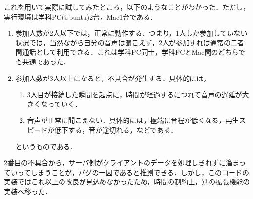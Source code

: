 \documentclass[10.5pt,a4paper,dvipdfmx]{jsarticle}
\begin{document}
これを用いて実際に試してみたところ，以下のようなことがわかった．ただし，実行環境は学科PC(Ubuntu)2台，Mac1台である．
\begin{enumerate}
    \item 参加人数が2人以下では，正常に動作する．つまり，1人しか参加していない状況では，当然ながら自分の音声は聞こえず，2人が参加すれば通常の二者間通話として利用できる．これは学科PC同士，学科PCとMac間のどちらでも共通であった．
    \item 参加人数が3人以上になると，不具合が発生する．具体的には，
        \begin{enumerate}
            \item 3人目が接続した瞬間を起点に，時間が経過するにつれて音声の遅延が大きくなっていく．
            \item 音声が正常に聞こえない．具体的には，極端に音程が低くなる，再生スピードが低下する，音が途切れる，などである．
        \end{enumerate}
        というものである．
\end{enumerate}
2番目の不具合から，サーバ側がクライアントのデータを処理しきれずに溜まっていってしまうことが，バグの一因であると推測できる．しかし，このコードの実装ではこれ以上の改良が見込めなかったため，時間の制約上，別の拡張機能の実装へ移った．



\end{document}
